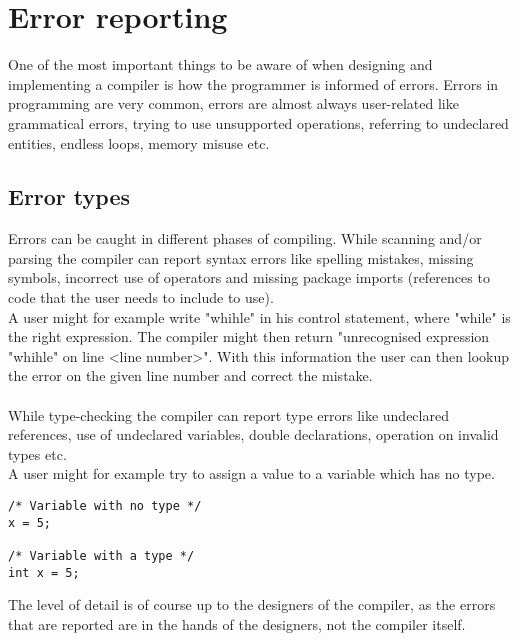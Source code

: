 \section{Error reporting}

One of the most important things to be aware of when designing and implementing a compiler is how the programmer is informed of errors. Errors in programming are very common, errors are almost always user-related like grammatical errors, trying to use unsupported operations, referring to undeclared entities, endless loops, memory misuse etc.

\subsection{Error types}
Errors can be caught in different phases of compiling.
While scanning and/or parsing the compiler can report syntax errors like spelling mistakes, missing symbols, incorrect use of operators and missing package imports (references to code that the user needs to include to use).\\
A user might for example write "whihle" in his control statement, where "while" is the right expression. The compiler might then return "unrecognised expression "whihle" on line <line number>". With this information the user can then lookup the error on the given line number and correct the mistake.\\\\
While type-checking the compiler can report type errors like undeclared references, use of undeclared variables, double declarations, operation on invalid types etc.\\
A user might for example try to assign a value to a variable which has no type.
{\begin{lstlisting}[numbers=none]
/* Variable with no type */
x = 5;

/* Variable with a type */
int x = 5;
\end{lstlisting}}
The level of detail is of course up to the designers of the compiler, as the errors that are reported are in the hands of the designers, not the compiler itself.